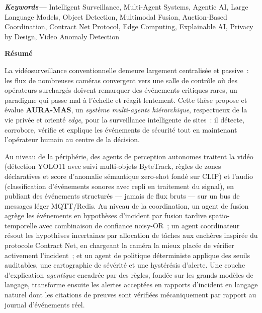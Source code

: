 \documentclass[openany,12pt,oneside]{extreport}
\begin{document}
\vskip 0.5cm
\providecommand{\keywords}[1] {
  \small
  \textbf{\textit{Keywords---}} #1
}
\keywords{Intelligent Surveillance, Multi-Agent Systems, Agentic AI, Large Language Models, Object Detection, Multimodal Fusion, Auction-Based Coordination, Contract Net Protocol, Edge Computing, Explainable AI, Privacy by Design, Video Anomaly Detection}

\newpage
\vspace*{3cm}
\begin{center}
    {\Large\bf Résumé}
\end{center} \vskip 1cm

La vidéosurveillance conventionnelle demeure largement centralisée et passive~: les flux de nombreuses caméras convergent vers une salle de contrôle où des opérateurs surchargés doivent remarquer des événements critiques rares, un paradigme qui passe mal à l'échelle et réagit lentement. Cette thèse propose et évalue \textbf{AURA-MAS}, un \emph{système multi-agents hiérarchique}, respectueux de la vie privée et orienté \emph{edge}, pour la surveillance intelligente de sites~: il détecte, corrobore, vérifie et explique les événements de sécurité tout en maintenant l'opérateur humain au centre de la décision.

Au niveau de la périphérie, des agents de perception autonomes traitent la vidéo (détection YOLO11 avec suivi multi-objets ByteTrack, règles de zones déclaratives et score d'anomalie sémantique zero-shot fondé sur CLIP) et l'audio (classification d'événements sonores avec repli en traitement du signal), en publiant des événements structurés --- jamais de flux bruts --- sur un bus de messages léger MQTT/Redis. Au niveau de la coordination, un agent de fusion agrège les événements en hypothèses d'incident par fusion tardive spatio-temporelle avec combinaison de confiance noisy-OR~; un agent coordinateur résout les hypothèses incertaines par allocation de tâches aux enchères inspirée du protocole Contract Net, en chargeant la caméra la mieux placée de vérifier activement l'incident~; et un agent de politique déterministe applique des seuils auditables, une cartographie de sévérité et une hystérésis d'alerte. Une couche d'explication \emph{agentique} encadrée par des règles, fondée sur les grands modèles de langage, transforme ensuite les alertes acceptées en rapports d'incident en langage naturel dont les citations de preuves sont vérifiées mécaniquement par rapport au journal d'événements réel.
\end{document}
